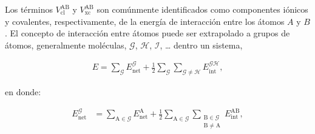 %
%
%

Los términos $V_{\mathrm{cl}}^{\mathrm{AB}}$ y $V_{\mathrm{xc}}^{\mathrm{AB}}$
son comúnmente identificados como componentes iónicos y covalentes,
respectivamente, de la energía de interacción entre los átomos $A$ y $B$. El
concepto de interacción entre átomos puede ser extrapolado a grupos de átomos,
generalmente moléculas, $\mathscr{G}$, $\mathscr{H}$, $\mathscr{I}$, \ldots
dentro un sistema,

\begin{align}
  E = \displaystyle\sum_{\mathscr{G}}E_{\mathrm{net}}^{\mathscr{G}} + 
      \displaystyle\frac{1}{2}\displaystyle\sum_{\mathscr{G}}\displaystyle\sum_{\mathscr{G\neq H}}E_{\mathrm{int}}^{\mathscr{GH}}, 
\end{align}

\noindent en donde:

\begin{align} \label{e_net}
E_{\mathrm{net}}^{\mathscr{G}} &= \displaystyle\sum_{\mathrm{A}\in\mathscr{G}}E_{\mathrm{net}}^{\mathrm{A}} +
                                  \displaystyle\frac{1}{2}\displaystyle\sum_{\mathrm{A}\in\mathscr{G}}
                                  \displaystyle\sum_{\substack{\mathrm{B}\in\mathscr{G} \\ \mathrm{B}\neq \mathrm{A}}}E_{\mathrm{int}}^{\mathrm{AB}},
\end{align}

